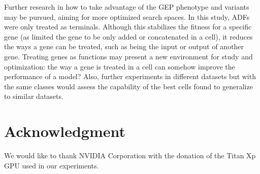 \documentclass[conference]{IEEEtran}
\begin{document}
	Further research in how to take advantage of the GEP phenotype and variants may be pursued, aiming for more optimized search spaces.
	In this study, ADFs were only treated as terminals.
	Although this stabilizes the fitness for a specific gene (as limited the gene to be only added or concatenated in a cell), it reduces the ways a gene can be treated, such as being the input or output of another gene.
	Treating genes as functions may present a new environment for study and optimization: the way a gene is treated in a cell can somehow improve the performance of a model?
	Also, further experiments in different datasets but with the same classes would assess the capability of the best cells found to generalize to similar datasets.
	
	\section*{Acknowledgment}
	
	We would like to thank NVIDIA Corporation with the donation of the Titan Xp GPU used in our experiments.
	
	
	
	
\end{document}
